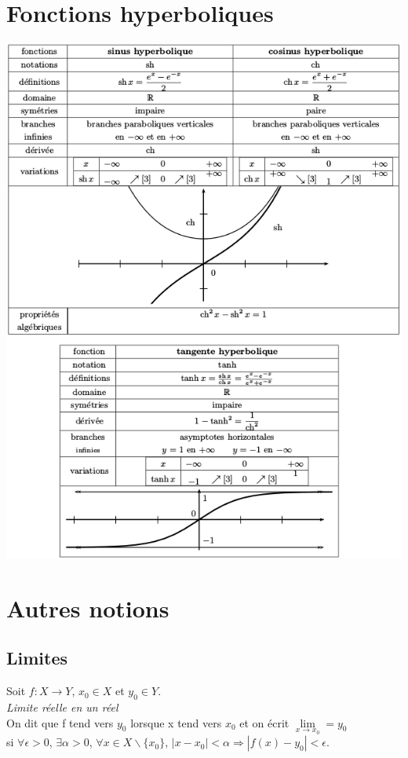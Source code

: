 \documentclass[a4paper,10pt]{book}
\begin{document}
\section{Fonctions hyperboliques}
\begin{center} \includegraphics[scale=0.75]{images/022.png} \end{center}

\newpage

\section{Autres notions}
\subsection{Limites}
Soit $f : X \longrightarrow Y$, $x_{0} \in X$ et $y_{0} \in Y$.\\

\textit{Limite réelle en un réel}\\
On dit que f tend vers $y_{0}$ lorsque x tend vers $x_{0}$ et on écrit $\underset{x \rightarrow x_{0}}{\lim}=y_{0}$\\
si $\forall \epsilon >0$, $\exists \alpha >0$, $\forall x \in X\backslash \{x_{0}\}$, $|x-x_{0}|<\alpha \Longrightarrow |f(x)-y_{0}|<\epsilon$.\\
\end{document}
